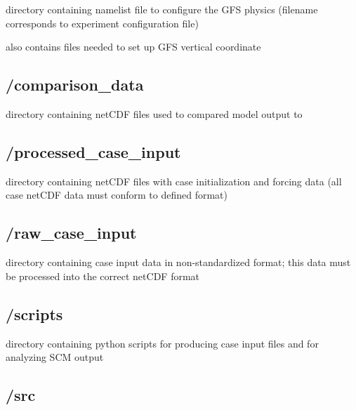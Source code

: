 \begin{DoxyItemize}
\item directory containing namelist file to configure the G\+FS physics (filename corresponds to experiment configuration file)
\item also contains files needed to set up G\+FS vertical coordinate 
\end{DoxyItemize}\hypertarget{index_comparison_data}{}\subsection{/comparison\+\_\+data}\label{index_comparison_data}

\begin{DoxyItemize}
\item directory containing net\+C\+DF files used to compared model output to 
\end{DoxyItemize}\hypertarget{index_processed_case_input}{}\subsection{/processed\+\_\+case\+\_\+input}\label{index_processed_case_input}

\begin{DoxyItemize}
\item directory containing net\+C\+DF files with case initialization and forcing data (all case net\+C\+DF data must conform to defined format) 
\end{DoxyItemize}\hypertarget{index_raw_case_input}{}\subsection{/raw\+\_\+case\+\_\+input}\label{index_raw_case_input}

\begin{DoxyItemize}
\item directory containing case input data in non-\/standardized format; this data must be processed into the correct net\+C\+DF format 
\end{DoxyItemize}\hypertarget{index_scripts}{}\subsection{/scripts}\label{index_scripts}

\begin{DoxyItemize}
\item directory containing python scripts for producing case input files and for analyzing S\+CM output 
\end{DoxyItemize}\hypertarget{index_src}{}\subsection{/src}\label{index_src}

